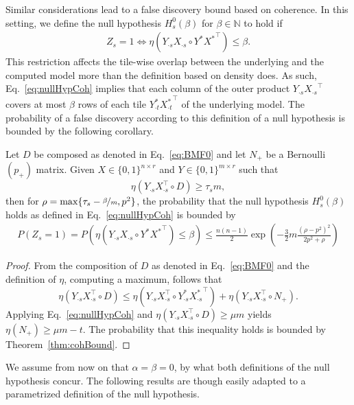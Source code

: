Similar considerations lead to a false discovery bound based on coherence. In this setting, we define the null hypothesis $H_s^0(\beta)$ for $\beta\in\mathbb{N}$ to hold if 
\begin{align}\label{eq:nullHypCoh}
Z_s=1 \Leftrightarrow \eta(Y_{\cdot s}X_{\cdot s}\circ Y^*{X^*}^\top)\leq \beta.
\end{align}
This restriction affects the tile-wise overlap between the underlying and the computed model more than the definition based on density does. As such, Eq.~\eqref{eq:nullHypCoh} implies that each column of the outer product $Y_{\cdot s}{X_{\cdot s}}^\top$ covers at most $\beta$ rows of each tile $Y^*_{\cdot t}{X^*_{\cdot t}}^\top$ of the underlying model. The probability of a false discovery according to this definition of a null hypothesis is bounded by the following corollary. 
\begin{corollary}\label{thm:cohZ}
Let $D$ be composed as denoted in Eq.~\eqref{eq:BMF0} and let $N_+$ be a Bernoulli $(p_+)$ matrix. Given $X\in\{0,1\}^{n\times r}$ and $Y\in\{0,1\}^{m\times r}$ such that 
\[\eta(Y_{\cdot s}X_{\cdot s}^\top \circ D)\geq \tau_s m,\] 
then for $\rho = \max\{\tau_s-\nicefrac{\beta}{m},p^2\}$, the probability that the null hypothesis $H_s^0(\beta)$ holds as defined in Eq.~\eqref{eq:nullHypCoh} is bounded by
\begin{align*}
P(Z_s=1)=P\left(\eta(Y_{\cdot s}X_{\cdot s}\circ Y^*{X^*}^\top)\leq \beta\right)\leq \frac{n(n-1)}{2}\exp\left(-\frac{3}{2}m\frac{(\rho-p^2)^2}{2p^2+\rho}\right)
\end{align*}
\end{corollary}
\begin{proof} 
From the composition of $D$ as denoted in Eq.~\eqref{eq:BMF0} and the definition of $\eta$, computing a maximum, follows that 
\[\eta(Y_{\cdot s}X_{\cdot s}^\top \circ D)\leq \eta(Y_{\cdot s}X_{\cdot s}^\top \circ Y^*_{\cdot s}{X^*_{\cdot s}}^\top)+\eta(Y_{\cdot s}X_{\cdot s}^\top \circ N_+).\]
Applying Eq.~\eqref{eq:nullHypCoh} and $\eta(Y_{\cdot s}X_{\cdot s}^\top \circ D)\geq \mu m$ yields
$\eta(N_+)\geq \mu m-t$.
The probability that this inequality holds is bounded by Theorem~\ref{thm:cohBound}.
\end{proof}
We assume from now on that $\alpha=\beta=0$, by what both definitions of the null hypothesis concur. The following results are though easily adapted to a parametrized definition of the null hypothesis.  
